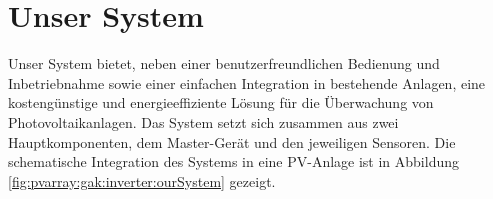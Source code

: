 \clearpage
\section{Unser System}
\label{sec:ourSystem}

Unser   System  bietet,   neben  einer   benutzerfreundlichen  Bedienung   und
Inbetriebnahme  sowie  einer  einfachen  Integration  in  bestehende  Anlagen,
eine kosteng\"unstige  und energieeffiziente L\"osung f\"ur  die \"Uberwachung
von   Photovoltaikanlagen. Das   System   setzt   sich   zusammen   aus   zwei
Hauptkomponenten,   dem  Master-Ger\"at   und  den   jeweiligen  Sensoren. Die
schematische  Integration  des Systems  in  eine  PV-Anlage ist  in  Abbildung
\ref{fig:pvarray:gak:inverter:ourSystem} gezeigt.

